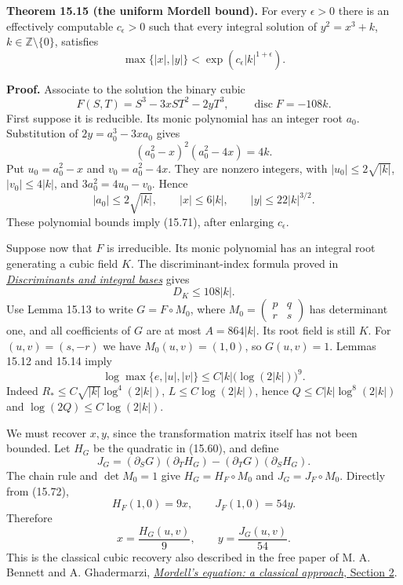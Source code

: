 \documentclass[
  11pt,
  a4paper,
]{article}
\begin{document}
\textbf{Theorem 15.15 (the uniform Mordell bound).} For every
\(\epsilon>0\) there is an effectively computable \(c_\epsilon>0\) such
that every integral solution of \(y^2=x^3+k\),
\(k\in\mathbb Z\setminus\{0\}\), satisfies \[
\max\{|x|,|y|\}<\exp(c_\epsilon |k|^{1+\epsilon}).
\tag{15.71}
\]

\textbf{Proof.} Associate to the solution the binary cubic \[
F(S,T)=S^3-3xST^2-2yT^3,\qquad
\operatorname{disc}F=-108k.
\tag{15.72}
\] First suppose it is reducible. Its monic polynomial has an integer
root \(a_0\). Substitution of \(2y=a_0^3-3xa_0\) gives \[
(a_0^2-x)^2(a_0^2-4x)=4k.
\] Put \(u_0=a_0^2-x\) and \(v_0=a_0^2-4x\). They are nonzero integers,
with \(|u_0|\le2\sqrt{|k|}\), \(|v_0|\le4|k|\), and \(3a_0^2=4u_0-v_0\).
Hence \[
|a_0|\le2\sqrt{|k|},\qquad
|x|\le6|k|,\qquad |y|\le22|k|^{3/2}.
\] These polynomial bounds imply (15.71), after enlarging
\(c_\epsilon\).

Suppose now that \(F\) is irreducible. Its monic polynomial has an
integral root generating a cubic field \(K\). The discriminant-index
formula proved in
\href{https://kokunoyumeto.github.io/open-math-courses-public/courses/NT-ANT/discriminants-and-integral-bases.html}{\emph{Discriminants
and integral bases}} gives \[
D_K\le108|k|.
\tag{15.73}
\] Use Lemma 15.13 to write \(G=F\circ M_0\), where
\(M_0=\begin{pmatrix}p&q\\r&s\end{pmatrix}\) has determinant one, and
all coefficients of \(G\) are at most \(A=864|k|\). Its root field is
still \(K\). For \((u,v)=(s,-r)\) we have \(M_0(u,v)=(1,0)\), so
\(G(u,v)=1\). Lemmas 15.12 and 15.14 imply \[
\log\max\{e,|u|,|v|\}
 \le C |k|\bigl(\log(2|k|)\bigr)^9.
\tag{15.74}
\] Indeed \(R_*\le C\sqrt{|k|}\log^4(2|k|)\), \(L\le C\log(2|k|)\),
hence \(Q\le C|k|\log^8(2|k|)\) and \(\log(2Q)\le C\log(2|k|)\).

We must recover \(x,y\), since the transformation matrix itself has not
been bounded. Let \(H_G\) be the quadratic in (15.60), and define \[
J_G=(\partial_S G)(\partial_T H_G)
              -(\partial_T G)(\partial_S H_G).
\] The chain rule and \(\det M_0=1\) give \(H_G=H_F\circ M_0\) and
\(J_G=J_F\circ M_0\). Directly from (15.72), \[
H_F(1,0)=9x,\qquad J_F(1,0)=54y.
\] Therefore \[
x=\frac{H_G(u,v)}9,\qquad
y=\frac{J_G(u,v)}{54}.
\tag{15.75}
\] This is the classical cubic recovery also described in the free paper
of M. A. Bennett and A. Ghadermarzi,
\href{https://arxiv.org/abs/1311.7077}{\emph{Mordell's equation: a
classical approach}, Section 2}.
\end{document}
